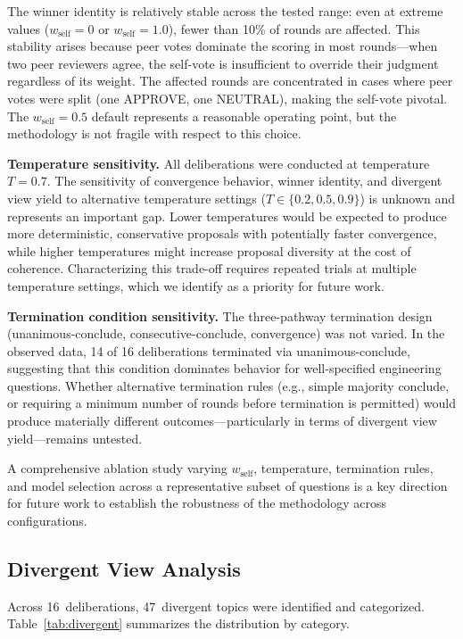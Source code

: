 \documentclass[11pt,a4paper]{article}
\begin{document}
The winner identity is relatively stable across the tested range: even at extreme values ($w_{\text{self}} = 0$ or $w_{\text{self}} = 1.0$), fewer than 10\% of rounds are affected. This stability arises because peer votes dominate the scoring in most rounds---when two peer reviewers agree, the self-vote is insufficient to override their judgment regardless of its weight. The affected rounds are concentrated in cases where peer votes were split (one APPROVE, one NEUTRAL), making the self-vote pivotal. The $w_{\text{self}} = 0.5$ default represents a reasonable operating point, but the methodology is not fragile with respect to this choice.

\textbf{Temperature sensitivity.} All deliberations were conducted at temperature $T = 0.7$. The sensitivity of convergence behavior, winner identity, and divergent view yield to alternative temperature settings ($T \in \{0.2, 0.5, 0.9\}$) is unknown and represents an important gap. Lower temperatures would be expected to produce more deterministic, conservative proposals with potentially faster convergence, while higher temperatures might increase proposal diversity at the cost of coherence. Characterizing this trade-off requires repeated trials at multiple temperature settings, which we identify as a priority for future work.

\textbf{Termination condition sensitivity.} The three-pathway termination design (unanimous-conclude, consecutive-conclude, convergence) was not varied. In the observed data, 14 of 16 deliberations terminated via unanimous-conclude, suggesting that this condition dominates behavior for well-specified engineering questions. Whether alternative termination rules (e.g., simple majority conclude, or requiring a minimum number of rounds before termination is permitted) would produce materially different outcomes---particularly in terms of divergent view yield---remains untested.

A comprehensive ablation study varying $w_{\text{self}}$, temperature, termination rules, and model selection across a representative subset of questions is a key direction for future work to establish the robustness of the methodology across configurations.

\subsection{Divergent View Analysis}

Across 16~deliberations, 47~divergent topics were identified and categorized. Table~\ref{tab:divergent} summarizes the distribution by category.
\end{document}
